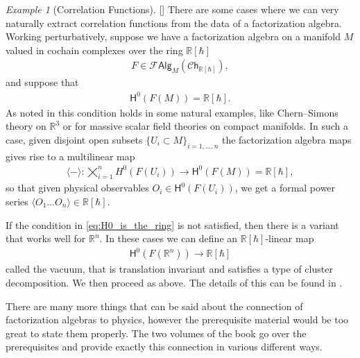 \documentclass[12pt,a4paper]{article}
\newcounter{counter} \numberwithin{counter}{section}
\theoremstyle{definition}
\theoremstyle{plain}
\theoremstyle{remark}
\newtheorem{example}[counter]{Example}
\newcommand{\falg}{\mathscr{F} \mathsf{Alg}}
\begin{document}
\begin{example}[Correlation Functions][\cite[sec.1.4.4]{cg2016}]
    There are some cases where we can very naturally extract correlation functions from the data of a factorization algebra. Working perturbatively, suppose we have a factorization algebra on a manifold $M$ valued in cochain complexes over the ring $\mathbb{R}[\hbar]$
    \begin{align}
        F \in \falg_M (\mathscr{C}\mathsf{h}_{\mathbb{R}[\hbar]}),
    \end{align}
    and suppose that
    \begin{align}\label{eq:H0_is_the_ring}
        \mathsf{H}^0 (F(M)) = \mathbb{R}[\hbar].
    \end{align}
    As noted in \cite[sec.1.4.4]{cg2016} this condition holds in some natural examples, like Chern--Simons theory on $\mathbb{R}^3$ or for massive scalar field theories on compact manifolds. In such a case, given disjoint open subsets $\{U_i \subset M\}_{i=1, \dots, n}$ the factorization algebra maps gives rise to a multilinear map
    \begin{align}
        \langle - \rangle: \bigtimes_{i=1}^{n} H^0(F(U_i)) \xrightarrow{\quad} \mathsf{H}^0 (F(M)) = \mathbb{R}[\hbar],
    \end{align}
    so that given physical observables $O_i \in \mathsf{H}^0(F(U_i))$, we get a formal power series $\langle O_1 \dots O_n \rangle \in \mathbb{R}[\hbar]$.

    If the condition in \cref{eq:H0_is_the_ring} is not satisfied, then there is a variant that works well for $\mathbb{R}^n$. In these cases we can define an $\mathbb{R}[\hbar]$-linear map
    \begin{align}
        \mathsf{H}^0(F(\mathbb{R}^n)) \rightarrow \mathbb{R}[\hbar]
    \end{align}
    called the vacuum, that is translation invariant and satisfies a type of cluster decomposition. We then proceed as above. The details of this can be found in \cite{cg2016}.
\end{example}

There are many more things that can be said about the connection of factorization algebras to physics, however the prerequisite material would be too great to state them properly. The two volumes of the book \cite{cg2016} go over the prerequisites and provide exactly this connection in various different ways.
\end{document}
